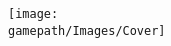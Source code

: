 \documentclass[sheet]{celeste}
\begin{document}
\begin{center}
\texttt{[image: \\gamepath/Images/Cover]}
\vfill
{\Huge\oldcountry\csname\jobname\endcsname{\full}}
\vfill
{\huge\csname\jobname{}}
\end{center}
\end{document}
